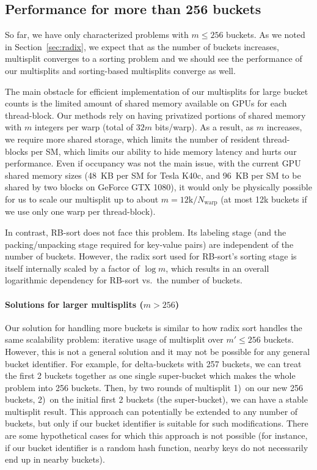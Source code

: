 \subsection{Performance for more than 256 buckets}\label{subsec:perf_more}
So far, we have only characterized problems with $m \leq 256$ buckets.
As we noted in Section~\ref{sec:radix}, we expect that as the number of buckets increases, multisplit converges to a sorting problem and we should see the performance of our multisplits and sorting-based multisplits converge as well.

The main obstacle for efficient implementation of our multisplits for large  bucket counts is the limited amount of shared memory available on GPUs for each thread-block.
Our methods rely on having privatized portions of shared memory with $m$ integers per warp (total of $32m$ bits/warp).
As a result, as $m$ increases, we require more shared storage, which limits the number of resident thread-blocks per SM, which limits our ability to hide memory latency and hurts our performance.
Even if occupancy was not the main issue, with the current GPU shared memory sizes (48~KB per SM for Tesla K40c, and 96~KB per SM to be shared by two blocks on GeForce GTX 1080), it would only be physically possible for us to scale our multisplit up to about $m = 12\text{k}/{N_\text{warp}}$ (at most 12k buckets if we use only one warp per thread-block).

In contrast, RB-sort does not face this problem. Its labeling stage (and the packing/unpacking stage required for key-value pairs) are independent of the number of buckets. However, the radix sort used for RB-sort's sorting stage is itself internally scaled by a factor of $\log m$, which results in an overall logarithmic dependency for RB-sort vs.\ the number of buckets.

\paragraph{Solutions for larger multisplits ($m>256$)}
Our solution for handling more buckets is similar to how radix sort handles the same scalability problem: iterative usage of multisplit over $m' \leq 256$ buckets. However, this is not a general solution and it may not be possible for any general bucket identifier.
For example, for delta-buckets with 257 buckets, we can treat the first 2 buckets together as one single super-bucket which makes the whole problem into 256 buckets. Then, by two rounds of multisplit 1)~on our new 256 buckets, 2)~on the initial first 2 buckets (the super-bucket), we can have a stable multisplit result.
This approach can potentially be extended to any number of buckets, but only if our bucket identifier is suitable for such modifications.
There are some hypothetical cases for which this approach is not possible (for instance, if our bucket identifier is a random hash function, nearby keys do not necessarily end up in nearby buckets).

